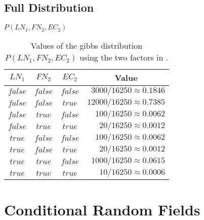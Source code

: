 \subsection{Full Distribution}\label{app:subsec-gd-full-distribution}
\begin{table}[H]
\centering
$P(LN_1,FN_2,EC_2)$\par
\smallskip
\begin{tabular}{c c c r}
 \toprule
 $LN_1$ & $FN_2$ & $EC_2$ & \multicolumn{1}{c}{Value} \\
 \midrule
 $false$ & $false$ & $false$ & $3000/16250\approx0.1846$\\
 $false$ & $false$ & $true$  & $12000/16250\approx0.7385$\\
 $false$ & $true$  & $false$ & $100/16250\approx0.0062$\\
 $false$ & $true$  & $true$  & $20/16250\approx0.0012$\\
 $true$  & $false$ & $false$ & $100/16250\approx0.0062$\\
 $true$  & $false$ & $true$  & $20/16250\approx0.0012$\\
 $true$  & $true$  & $false$ & $1000/16250\approx0.0615$\\
 $true$  & $true$  & $true$  & $10/16250\approx0.0006$\\
 \bottomrule
\end{tabular}
\caption{Values of the \Gls{gibbs distribution} $P(LN_1,FN_2,EC_2)$ using the two \glspl{factor} in .}
\label{tab:example-factor-product}
\end{table}
\section{Conditional Random Fields}\label{app:sec-conditional-random-fields}
